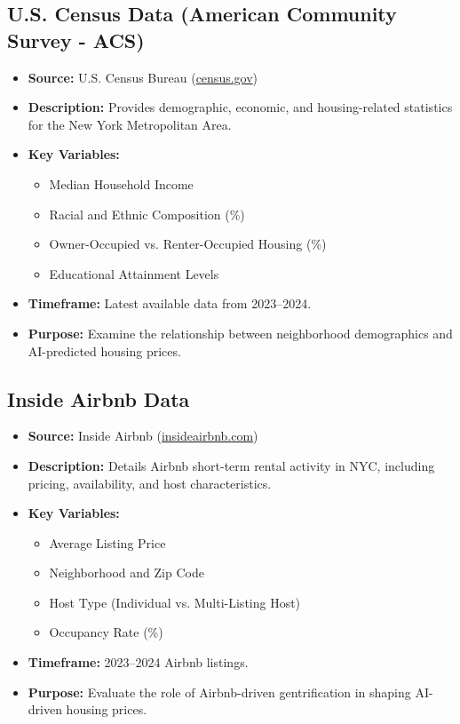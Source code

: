 \documentclass{article}
\begin{document}
\subsection{U.S. Census Data (American Community Survey - ACS)}
\begin{itemize}
    \item \textbf{Source:} U.S. Census Bureau (\href{https://www.census.gov/data.html}{census.gov})
    \item \textbf{Description:} Provides demographic, economic, and housing-related statistics for the New York Metropolitan Area.
    \item \textbf{Key Variables:}
    \begin{itemize}
        \item Median Household Income
        \item Racial and Ethnic Composition (\%)
        \item Owner-Occupied vs. Renter-Occupied Housing (\%)
        \item Educational Attainment Levels
    \end{itemize}
    \item \textbf{Timeframe:} Latest available data from 2023–2024.
    \item \textbf{Purpose:} Examine the relationship between neighborhood demographics and AI-predicted housing prices.
\end{itemize}

\subsection{Inside Airbnb Data}
\begin{itemize}
    \item \textbf{Source:} Inside Airbnb (\href{http://insideairbnb.com/get-the-data.html}{insideairbnb.com})
    \item \textbf{Description:} Details Airbnb short-term rental activity in NYC, including pricing, availability, and host characteristics.
    \item \textbf{Key Variables:}
    \begin{itemize}
        \item Average Listing Price
        \item Neighborhood and Zip Code
        \item Host Type (Individual vs. Multi-Listing Host)
        \item Occupancy Rate (\%)
    \end{itemize}
    \item \textbf{Timeframe:} 2023–2024 Airbnb listings.
    \item \textbf{Purpose:} Evaluate the role of Airbnb-driven gentrification in shaping AI-driven housing prices.
\end{itemize}
\end{document}
